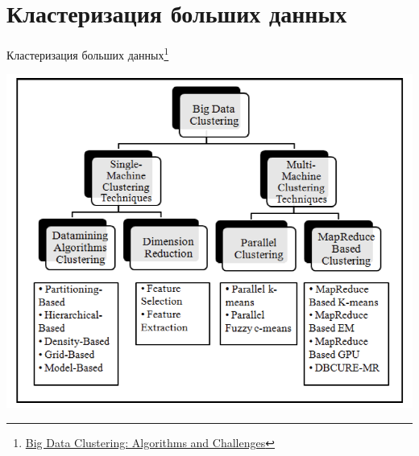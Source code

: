 \documentclass[aspectratio=169]{beamer}
\begin{document}

\section{Кластеризация больших данных}


\begin{frame}

\begin{center}
{\Large Кластеризация больших данных\footnote{\href{http://www.researchgate.net/publication/276934256_Big_Data_Clustering_Algorithms_and_Challenges}{Big Data Clustering: Algorithms and Challenges}}}

\vspace{2em}
\includegraphics[height=0.6\textheight]{images/bdc.png}
\end{center}

\end{frame}
\end{document}
